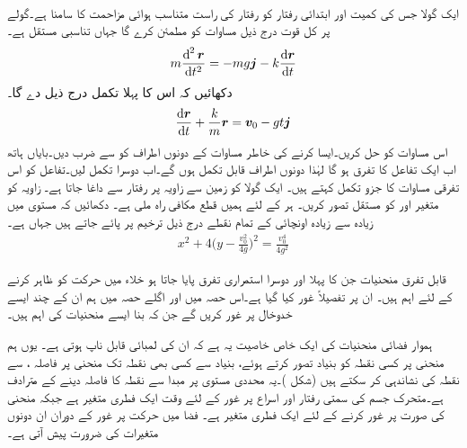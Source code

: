 \\
 ایک گولا جس کی کمیت  اور ابتدائی رفتار  کو   رفتار کی راست متناسب ہوائی مزاحمت کا سامنا ہے۔گولے پر کل قوت  درج ذیل مساوات کو مطمئن کرے گا جہاں  تناسبی  مستقل ہے۔
\begin{align*}
m\frac{\dif^{\,2}\kvec{r}}{\dif t^2}=-mg\aj-k\frac{\dif \kvec{r}}{\dif t}
\end{align*}
دکھائیں کہ اس کا پہلا تکمل درج ذیل دے گا۔
\begin{align*}
\frac{\dif \kvec{r}}{\dif t}+\frac{k}{m}\kvec{r}=\kvec{v}_0-gt\aj
\end{align*}
اس مساوات کو حل کریں۔ایسا کرنے کی خاطر مساوات کے دونوں اطراف کو  سے  ضرب دیں۔بایاں ہاتھ اب  ایک تفاعل کا تفرق ہو گا لہٰذا دونوں اطراف قابل تکمل ہوں گے۔اب دوسرا تکمل لیں۔تفاعل  کو اس تفرقی مساوات کا جزو تکمل کہتے ہیں۔
ایک گولا کو زمین سے  زاویہ  پر  رفتار سے داغا جاتا ہے۔ زاویہ  کو متغیر اور  کو مستقل  تصور  کریں۔ ہر  کے لئے ہمیں قطع مکافی راہ ملی ہے۔ دکھائیں کہ مستوی میں زیادہ سے زیادہ اونچائی کے تمام نقطے درج ذیل  ترخیم پر پائے جاتے ہیں  جہاں  ہے۔
\begin{align*}
x^2+4\big(y-\frac{v_0^2}{4g}\big)^2=\frac{v_0^4}{4g^2}
\end{align*}


قابل تفرق منحنیات جن کا   پہلا اور دوسرا استمراری تفرق پایا جاتا ہو خلاء  میں حرکت کو ظاہر کرنے  کے لئے  اہم  ہیں۔ ان پر تفصیلاً غور کیا گیا ہے۔اس حصہ میں اور اگلے حصہ میں ہم ان کے چند  ایسے   خدوخال پر غور کریں گے جن کہ بنا  ایسے   منحنیات کی اہم ہیں۔  

ہموار فضائی منحنیات کی ایک خاص خاصیت یہ ہے کہ ان کی لمبائی  قابل ناپ ہوتی ہے۔ یوں ہم  منحنی پر کسی نقطہ کو   بنیاد     تصور کرتے ہوئے،  بنیاد   سے کسی بھی نقطہ   تک منحنی پر فاصلہ ،  سے نقطہ      کی نشاندہی کر سکتے ہیں (شکل )۔یہ محددی مستوی پر  مبدا سے نقطہ کا فاصلہ دینے کے مترادف ہے۔متحرک جسم کی سمتی رفتار اور اسراع  پر غور کے لئے وقت ایک فطری متغیر ہے جبکہ  منحنی کی صورت  پر غور کرنے کے لئے ایک  فطری  متغیر ہے۔ فضا میں حرکت پر غور کے دوران ان دونوں متغیرات کی ضرورت پیش آتی ہے۔

